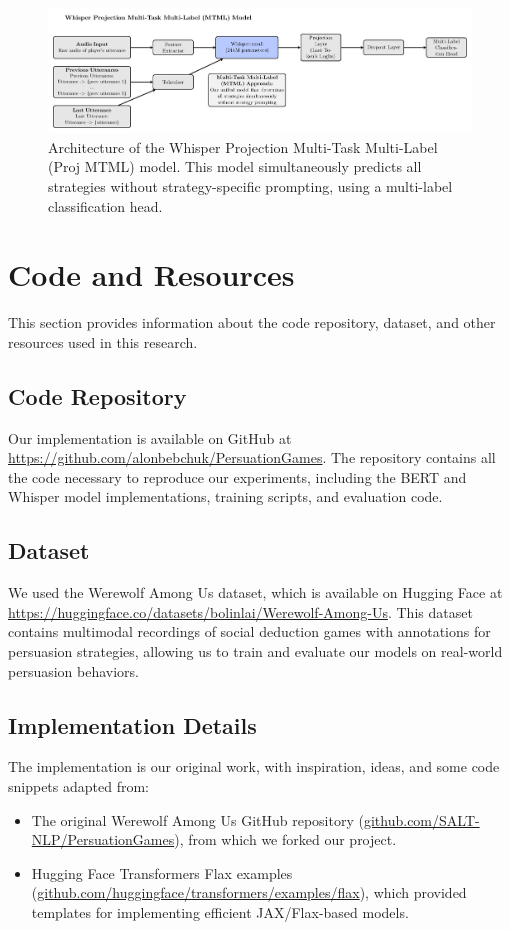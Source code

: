 \documentclass{article}
\begin{document}
\begin{figure}[H]
    \centering
    \includegraphics[width=\textwidth]{figures/png/whisper_proj_mtml.png}
    \caption{Architecture of the Whisper Projection Multi-Task Multi-Label (Proj MTML) model. This model simultaneously predicts all strategies without strategy-specific prompting, using a multi-label classification head.}
    \label{fig:app_whisper_proj_mtml}
\end{figure}

\section{Code and Resources}
This section provides information about the code repository, dataset, and other resources used in this research.

\subsection{Code Repository}
Our implementation is available on GitHub at \url{https://github.com/alonbebchuk/PersuationGames}. The repository contains all the code necessary to reproduce our experiments, including the BERT and Whisper model implementations, training scripts, and evaluation code.

\subsection{Dataset}
We used the Werewolf Among Us dataset, which is available on Hugging Face at \url{https://huggingface.co/datasets/bolinlai/Werewolf-Among-Us}. This dataset contains multimodal recordings of social deduction games with annotations for persuasion strategies, allowing us to train and evaluate our models on real-world persuasion behaviors.

\subsection{Implementation Details}
The implementation is our original work, with inspiration, ideas, and some code snippets adapted from:
\begin{itemize}
    \item The original Werewolf Among Us GitHub repository (\href{https://github.com/SALT-NLP/PersuationGames}{github.com/SALT-NLP/PersuationGames}), from which we forked our project.
    \item Hugging Face Transformers Flax examples (\href{https://github.com/huggingface/transformers/tree/main/examples/flax}{github.com/huggingface/transformers/examples/flax}), which provided templates for implementing efficient JAX/Flax-based models.
\end{itemize}
\end{document}
